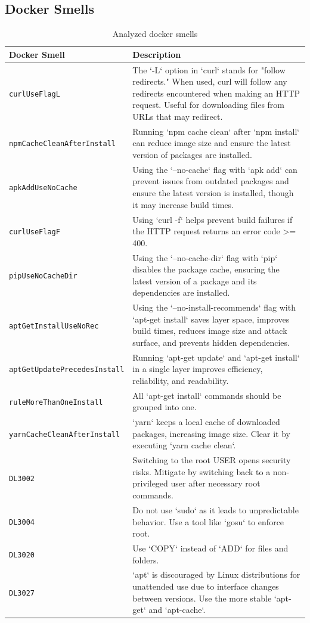 \documentclass[conference]{IEEEtran}
\begin{document}
\subsection{Docker Smells}

\begin{table}[h]
    \renewcommand{\arraystretch}{1.2}
    \caption{Analyzed docker smells}
    \label{tbl:smells}
    \begin{tabularx}{\linewidth}{l|X}
    \textbf{Docker Smell} & \textbf{Description} \\ \hline
    \texttt{curlUseFlagL} & The `-L` option in `curl` stands for "follow redirects." When used, curl will follow any redirects encountered when making an HTTP request. Useful for downloading files from URLs that may redirect. \\
    \texttt{npmCacheCleanAfterInstall} & Running `npm cache clean` after `npm install` can reduce image size and ensure the latest version of packages are installed. \\
    \texttt{apkAddUseNoCache} & Using the `--no-cache` flag with `apk add` can prevent issues from outdated packages and ensure the latest version is installed, though it may increase build times. \\
    \texttt{curlUseFlagF} & Using `curl -f` helps prevent build failures if the HTTP request returns an error code >= 400. \\
    \texttt{pipUseNoCacheDir} & Using the `--no-cache-dir` flag with `pip` disables the package cache, ensuring the latest version of a package and its dependencies are installed. \\
    \texttt{aptGetInstallUseNoRec} & Using the `--no-install-recommends` flag with `apt-get install` saves layer space, improves build times, reduces image size and attack surface, and prevents hidden dependencies. \\
    \texttt{aptGetUpdatePrecedesInstall} & Running `apt-get update` and `apt-get install` in a single layer improves efficiency, reliability, and readability. \\
    \texttt{ruleMoreThanOneInstall} & All `apt-get install` commands should be grouped into one. \\
    \texttt{yarnCacheCleanAfterInstall} & `yarn` keeps a local cache of downloaded packages, increasing image size. Clear it by executing `yarn cache clean`. \\
    \texttt{DL3002} & Switching to the root USER opens security risks. Mitigate by switching back to a non-privileged user after necessary root commands. \\
    \texttt{DL3004} & Do not use `sudo` as it leads to unpredictable behavior. Use a tool like `gosu` to enforce root. \\
    \texttt{DL3020} & Use `COPY` instead of `ADD` for files and folders. \\
    \texttt{DL3027} & `apt` is discouraged by Linux distributions for unattended use due to interface changes between versions. Use the more stable `apt-get` and `apt-cache`. \\
\end{tabularx}
\end{table}
\end{document}
